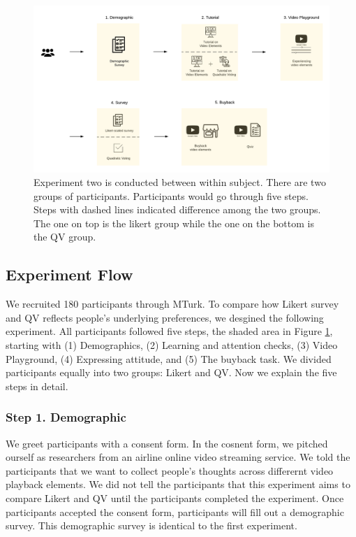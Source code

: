 \begin{figure}[htpb]
    \centering
    \includegraphics[width=\textwidth, keepaspectratio=true]{content/image/new_exp2_flow.pdf}
    \caption{
        Experiment two is conducted between within subject. There are two groups of participants. Participants would go through five steps. Steps with dashed lines indicated difference among the two groups. The one on top is the likert group while the one on the bottom is the QV group.
    }
    \label{fig:exp2_flow}
\end{figure}

\subsection{Experiment Flow}

We recruited 180 participants through MTurk. To compare how Likert survey and QV reflects people's underlying preferences, we desgined the following experiment. All participants followed five steps, the shaded area in Figure \ref{fig:exp2_flow}, starting with (1) Demographics, (2) Learning and attention checks, (3) Video Playground, (4) Expressing attitude, and (5) The buyback task. We divided participants equally into two groups: Likert and QV. Now we explain the five steps in detail.

\subsubsection{Step 1. Demographic}
We greet participants with a consent form. In the cosnent form, we pitched ourself as researchers from an airline online video streaming service. We told the participants that we want to collect people's thoughts across differernt video playback elements. We did not tell the participants that this experiment aims to compare Likert and QV until the participants completed the experiment. Once participants accepted the consent form, participants will fill out a demographic survey. This demographic survey is identical to the first experiment.

